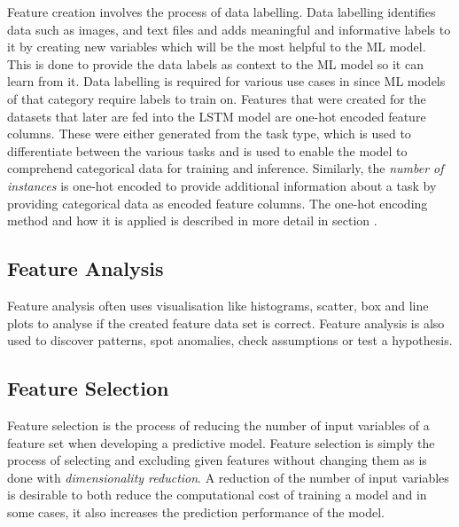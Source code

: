     Feature creation involves the process of data labelling.
    Data labelling identifies data such as images, and text files and adds meaningful and informative labels to it by creating new variables which will be the most helpful to the ML model. This is done to provide the data labels as context to the ML model so it can learn from it. Data labelling is required for various use cases in  since ML models of that category require labels to train on. Features that were created for the datasets that later are fed into the LSTM model are one-hot encoded feature columns. These were either generated from the task type, which is used to differentiate between the various tasks and is used to enable the model to comprehend categorical data for training and inference. Similarly, the \emph{number of instances} is one-hot encoded to provide additional information about a task by providing categorical data as encoded feature columns. The one-hot encoding method and how it is applied is described in more detail in section .

    \subsection{Feature Analysis}
    \label{sec:feature-analysis-preprocessing-architecture}
    
      Feature analysis often uses visualisation like histograms, scatter, box and line plots to analyse if the created feature data set is correct. Feature analysis is also used to discover patterns, spot anomalies, check assumptions or test a hypothesis.

    \subsection{Feature Selection}
    \label{sec:feature-selection-data-preprocessing-architecture}
  
      Feature selection is the process of reducing the number of input variables of a feature set when developing a predictive model.
      Feature selection is simply the process of selecting and excluding given features without changing them as is done with \emph{dimensionality reduction}.
      A reduction of the number of input variables is desirable to both reduce the computational cost of training a model and in some cases, it also increases the prediction performance of the model.
  

